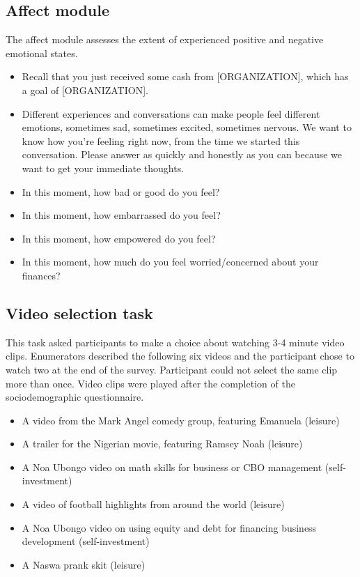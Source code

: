 \documentclass[11pt, a4paper]{article}\usepackage[]{graphicx}\usepackage[]{color}
\begin{document}
    \subsection{Affect module}
    The affect module assesses the extent of experienced positive and negative emotional states.
       \begin{itemize}
        \itemsep0em   
            \item Recall that you just received some cash from [ORGANIZATION], which has a goal of [ORGANIZATION]. 
            \item Different experiences and conversations can make people feel different emotions, sometimes sad, sometimes excited, sometimes nervous. We want to know how you're feeling right now, from the time we started this conversation. Please answer as quickly and honestly as you can because we want to get your immediate thoughts.
            \item In this moment, how bad or good do you feel?
            \item In this moment, how embarrassed do you feel?
            \item In this moment, how empowered do you feel?
            \item In this moment, how much do you feel worried/concerned about your finances? 
        \end{itemize}
    
    \subsection{Video selection task}

        This task asked participants to make a choice about watching 3-4 minute video clips. Enumerators described the following six videos and the participant chose to watch two at the end of the survey. Participant could not select the same clip more than once. Video clips were played after the completion of the sociodemographic questionnaire.

        \begin{itemize}
        \itemsep0em 
            \item A video from the Mark Angel comedy group, featuring Emanuela (leisure)
            \item A trailer for the Nigerian movie, featuring Ramsey Noah (leisure)
            \item A Noa Ubongo video on math skills for business or CBO management (self-investment)
            \item A video of football highlights from around the world (leisure)
            \item A Noa Ubongo video on using equity and debt for financing business development (self-investment)
            \item A Naswa prank skit (leisure)
        \end{itemize}
\end{document}
